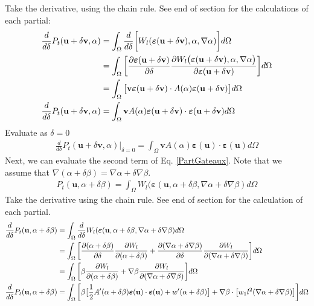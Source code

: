\documentclass[12pt,3p]{article}
\numberwithin{equation}{section}
\begin{document}
Take the derivative, using the chain rule. See end of section for the calculations of each partial:
\begin{align*}
\begin{split}
\frac{d}{d \delta} P_t (\mathbf{u} + \delta \mathbf{v}, \alpha) 
&= \int_{\Omega} \frac{d}{d \delta} \bigg[ W_l (\boldsymbol{\varepsilon}(\mathbf{u} + \delta \mathbf{v}), \alpha, \nabla \alpha) \bigg] d \Omega \\
&= \int_{\Omega} \bigg[ \pdv{\boldsymbol{\varepsilon} (\mathbf{u} + \delta \mathbf{v})}{\delta} \pdv{W_l \big( \boldsymbol{\varepsilon}(\mathbf{u} + \delta \mathbf{v}), \alpha, \nabla \alpha \big) }{\boldsymbol{\varepsilon} (\mathbf{u} + \delta \mathbf{v})} \bigg] d \Omega \\
&= \int_{\Omega} \big[ \mathbf{v} \boldsymbol{\varepsilon} (\mathbf{u} + \delta \mathbf{v}) \cdot A(\alpha) \boldsymbol{\varepsilon} (\mathbf{u} + \delta \mathbf{v}) \big] d \Omega \\
\frac{d}{d \delta} P_t (\mathbf{u} + \delta \mathbf{v}, \alpha) &= \int_{\Omega} \mathbf{v} A(\alpha) \boldsymbol{\varepsilon} (\mathbf{u} + \delta \mathbf{v}) \cdot \boldsymbol{\varepsilon} (\mathbf{u} + \delta \mathbf{v}) d \Omega 
\end{split}
\end{align*}
Evaluate as $\delta = 0$
\begin{align*}
\frac{d}{d \delta} P_t (\mathbf{u} + \delta \mathbf{v}, \alpha) \bigg\rvert_{\delta = 0} = \int_{\Omega} \mathbf{v} A(\alpha) \boldsymbol{\varepsilon} (\mathbf{u}) \cdot \boldsymbol{\varepsilon} (\mathbf{u}) d \Omega
\end{align*}
Next, we can evaluate the second term of Eq. \ref{PartGateaux}. Note that we assume that $\nabla (\alpha + \delta \beta) = \nabla \alpha + \delta \nabla \beta$. 
\begin{align*}
P_t (\mathbf{u}, \alpha + \delta \beta) = \int_{\Omega} W_l (\boldsymbol{\varepsilon}(\mathbf{u}, \alpha + \delta \beta, \nabla \alpha + \delta \nabla \beta) d \Omega
\end{align*}
Take the derivative using the chain rule. See end of section for the calculation of each partial. 
\begin{align*}
\frac{d}{d \delta} P_t (\mathbf{u}, \alpha + \delta \beta) &= \int_{\Omega} \frac{d}{d \delta} W_l (\boldsymbol{\varepsilon}(\mathbf{u}, \alpha + \delta \beta, \nabla \alpha + \delta \nabla \beta) d \Omega \\
        &= \int_{\Omega} \bigg[ \pdv{(\alpha + \delta \beta)}{\delta} \pdv{W_l}{(\alpha + \delta \beta)} + \pdv{(\nabla \alpha + \delta \nabla \beta)}{\delta} \pdv{W_l}{(\nabla \alpha + \delta \nabla \beta)} \bigg] d \Omega \\
        &= \int_{\Omega} \bigg[ \beta \pdv{W_l}{(\alpha + \delta \beta)} +\nabla \beta \pdv{W_l}{(\nabla \alpha + \delta \nabla \beta)} \bigg] d \Omega \\
\frac{d}{d \delta} P_t (\mathbf{u}, \alpha + \delta \beta) &= \int_{\Omega} \bigg[ \beta \big[ \frac{1}{2} A'(\alpha + \delta \beta) \boldsymbol{\varepsilon} (\mathbf{u}) \cdot \boldsymbol{\varepsilon} (\mathbf{u}) + w'(\alpha + \delta \beta) \big] + \nabla \beta \cdot \big[ w_1 l^2 (\nabla \alpha + \delta \nabla \beta) \big] \bigg] d \Omega  
\end{align*}
\end{document}
